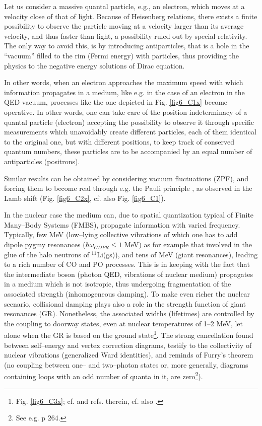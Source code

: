\begin{subappendices}
Let us consider a massive quantal particle, e.g., an electron, which moves at a velocity close of that of light. Because of Heisenberg relations, there exists a finite possibility to observe the particle moving at a velocity larger than its average velocity, and thus faster than light, a possibility ruled out by special relativity. The only way to avoid this, is by introducing antiparticles, that is a hole in the ``vacuum'' filled to the rim (Fermi energy) with particles, thus providing the physics to the negative energy solutions of Dirac equation.

In other words, when an electron approaches the maximum speed with which information propagates in a medium, like e.g. in the case of an electron in the QED vacuum, processes like the one depicted in Fig. \ref{fig6_C1x} become operative. In other words, one can take care of the position indeterminacy of a quantal particle (electron) accepting the possibility to observe it through specific measurements which unavoidably create different particles, each of them identical to the original one, but with different positions, to keep track of conserved quantum numbers, these particles are to be accompanied by an equal number of antiparticles (positrons).

Similar results can be obtained by considering vacuum fluctuations (ZPF), and forcing them to become real through e.g. the Pauli principle \citep{Pauli:47}, as observed in the Lamb shift (Fig. \ref{fig6_C2x}, cf. also Fig. \ref{fig6_C1}).


In the nuclear case the medium can, due to spatial quantization typical of Finite Many--Body Systems (FMBS), propagate information with varied frequency. Typically, few MeV (low--lying collective vibrations of  which one has to add dipole pygmy resonances ($\hbar\omega_{GDPR}\leq 1$ MeV) as for example that involved in the glue of the halo neutrons of $^{11}$Li(gs)), and tens of MeV (giant resonances), leading to a rich number of CO and PO processes. This is in keeping with the fact that the intermediate boson (photon QED, vibrations of nuclear medium) propagates in a medium which is not isotropic, thus undergoing fragmentation of the associated strength (inhomogeneous damping). To make even richer the nuclear scenario, collisional damping plays also a role in the strength function of giant resonances (GR). Nonetheless, the associated widths (lifetimes) are controlled by the coupling to doorway states, even at nuclear temperatures of 1--2 MeV, let alone when the GR is based on the ground state\footnote{Fig. \ref{fig6_C3x}; cf. \cite{Bortignon:98} and refs. therein, cf. also \cite{Broglia:87}.}. The strong cancellation found between self--energy and vertex correction diagrams, testify to the collectivity of nuclear vibrations (generalized Ward identities), and reminds of Furry's theorem (no coupling between one-- and two--photon states or, more generally, diagrams containing loops with an odd number of quanta in it, are zero\footnote{See e.g. \cite{Mehra:96} p 264.}).



\end{subappendices}
